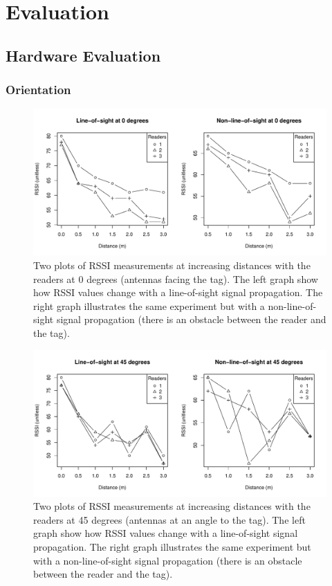 \chapter{Evaluation}
\label{ch:evaluation}

\section{Hardware Evaluation}

\subsection{Orientation}

\begin{figure}[H]
	\begin{center}
		\includegraphics[width=1\textwidth]{figures/rssi_distance_3m_0deg}
		\caption{Two plots of RSSI measurements at increasing distances with the readers at 0 degrees (antennas facing the tag). The left graph show how RSSI values change with a line-of-sight signal propagation. The right graph illustrates the same experiment but with a non-line-of-sight signal propagation (there is an obstacle between the reader and the tag).}
	\end{center}
\end{figure}

\begin{figure}[H]
	\begin{center}
		\includegraphics[width=1\textwidth]{figures/rssi_distance_3m_45deg}
		\caption{Two plots of RSSI measurements at increasing distances with the readers at 45 degrees (antennas at an angle to the tag). The left graph show how RSSI values change with a line-of-sight signal propagation. The right graph illustrates the same experiment but with a non-line-of-sight signal propagation (there is an obstacle between the reader and the tag).}
	\end{center}
\end{figure}

